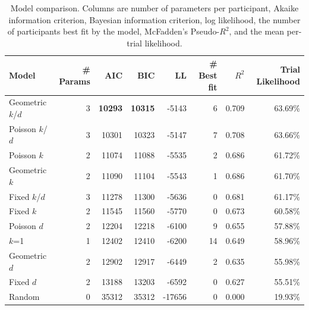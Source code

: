 \documentclass[11pt, oneside]{article}          %
\begin{document}
\begin{table}[ht!]
  \centering
  \begin{tabular}{lrrrrrrr}
  \toprule
  Model         & \# Params & AIC & BIC   & LL    & \# Best fit & $R^2$ & Trial Likelihood  \\
  \midrule
Geometric $k$/$d$ & 3 & \textbf{10293} & \textbf{10315} & -5143 & 6 & 0.709 & 63.69\% \\
Poisson $k$/$d$ & 3 & 10301 & 10323 & -5147 & 7 & 0.708 & 63.66\% \\
Poisson $k$ & 2 & 11074 & 11088 & -5535 & 2 & 0.686 & 61.72\% \\
Geometric $k$ & 2 & 11090 & 11104 & -5543 & 1 & 0.686 & 61.70\% \\
Fixed $k$/$d$ & 3 & 11278 & 11300 & -5636 & 0 & 0.681 & 61.17\% \\
Fixed $k$ & 2 & 11545 & 11560 & -5770 & 0 & 0.673 & 60.58\% \\
Poisson $d$ & 2 & 12204 & 12218 & -6100 & 9 & 0.655 & 57.88\% \\
$k$=1 & 1 & 12402 & 12410 & -6200 & 14 & 0.649 & 58.96\% \\
Geometric $d$ & 2 & 12902 & 12917 & -6449 & 2 & 0.635 & 55.98\% \\
Fixed $d$ & 2 & 13188 & 13203 & -6592 & 0 & 0.627 & 55.51\% \\
Random & 0 & 35312 & 35312 & -17656 & 0 & 0.000 & 19.93\% \\
  \bottomrule
  \end{tabular}
  \caption{Model comparison. Columns are number of parameters per participant, Akaike information criterion, Bayesian information criterion, log likelihood, the number of participants best fit by the model, McFadden's Pseudo-$R^2$, and the mean per-trial likelihood.}
  \label{tab:model-fits}
\end{table}
\end{document}

